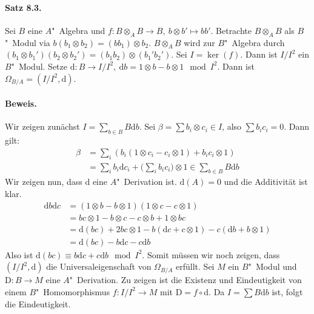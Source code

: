 \documentclass[11pt,b5paper,openany]{memoir}
\begin{document}
\paragraph{Satz 8.3.}\label{8.3} Sei $B$ eine $A$"~Algebra und $f:B\otimes_A B\to B,\ b\otimes b'\mapsto bb'$. Betrachte $B\otimes_AB$ als $B$"~Modul via $b(b_1\otimes b_2)=(bb_1)\otimes b_2$. $B\otimes_A B$ wird zur $B$"~Algebra durch $(b_1\otimes b_1')(b_2\otimes b_2')=(b_1b_2)\otimes (b_1'b_2')$. Sei $I=\ker(f)$. Dann ist $I/I^2$ ein $B$"~Modul. Setze $\mathrm{d}:B\to I/I^2,\ \mathrm{d}b=1\otimes b-b\otimes 1\mod I^2$. Dann ist $\Omega_{B/A}= (I/I^2,\mathrm{d})$.

\paragraph{Beweis.} Wir zeigen zunächst $I=\sum_{b\in B}B\mathrm{d}b$. Sei $\beta=\sum b_i\otimes c_i\in I$, also $\sum b_ic_i=0$. Dann gilt:
\begin{align*}
\beta &= \sum_i (b_i(1\otimes c_i-c_i\otimes 1) + b_ic_i\otimes 1)\\
&= \sum_i b_i \mathrm{d}c_i + \Big(\sum_i b_ic_i\Big)\otimes 1 \in\sum_{b\in B} B\mathrm{d}b
\end{align*}
Wir zeigen nun, dass $\mathrm{d}$ eine $A$"~Derivation ist. $\mathrm{d}(A)=0$ und die Additivität ist klar.
\begin{align*}
\mathrm{d}b\mathrm{d}c &= (1\otimes b- b\otimes 1)(1\otimes c-c\otimes 1)\\
&= bc\otimes 1 - b\otimes c- c\otimes b+1\otimes bc\\
&=\mathrm{d}(bc) + 2bc\otimes 1- b(\mathrm{d}c+c\otimes 1) - c (\mathrm{d}b + b\otimes 1)\\
&=\mathrm{d}(bc)-b\mathrm{d}c - c \mathrm{d}b
\end{align*}
Also ist $\mathrm{d}(bc)\equiv b\mathrm{d}c+c\mathrm{d}b\mod I^2$. Somit müssen wir noch zeigen, dass $(I/I^2,\mathrm{d})$ die Universaleigenschaft von $\Omega_{B/A}$ erfüllt. Sei $M$ ein $B$"~Modul und $\mathrm{D}:B\to M$ eine $A$"~Derivation. Zu zeigen ist die Existenz und Eindeutigkeit von einem $B$"~Homomorphismus $f:I/I^2\to M$ mit $\mathrm{D}=f\circ \mathrm{d}$. Da $I=\sum B\mathrm{d}b$ ist, folgt die Eindeutigkeit.
\end{document}
